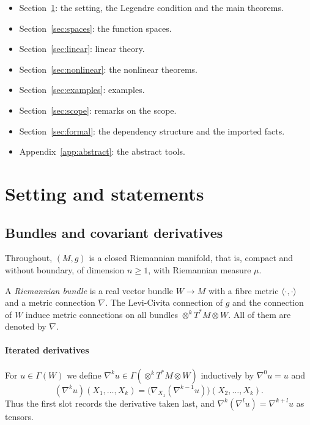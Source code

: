 \documentclass[11pt,reqno]{amsart}
\theoremstyle{definition}
\theoremstyle{remark}
\newcommand{\ip}[2]{\langle #1,#2\rangle}
\numberwithin{equation}{section}
\begin{document}
\begin{itemize}[nosep]
\item Section~\ref{sec:setting}: the setting, the Legendre condition and the main theorems.
\item Section~\ref{sec:spaces}: the function spaces.
\item Section~\ref{sec:linear}: linear theory.
\item Section~\ref{sec:nonlinear}: the nonlinear theorems.
\item Section~\ref{sec:examples}: examples.
\item Section~\ref{sec:scope}: remarks on the scope.
\item Section~\ref{sec:formal}: the dependency structure and the imported facts.
\item Appendix~\ref{app:abstract}: the abstract tools.
\end{itemize}

\section{Setting and statements}\label{sec:setting}

\subsection{Bundles and covariant derivatives}

Throughout, $(M,g)$ is a closed Riemannian manifold, that is, compact and without boundary, of
dimension $n\ge 1$, with Riemannian measure $\mu$.

A \emph{Riemannian bundle} is a real vector bundle $W\to M$ with a fibre metric $\ip{\cdot}{\cdot}$ and
a metric connection $\nabla$. The Levi-Civita connection of $g$ and the connection of $W$ induce metric
connections on all bundles $\otimes^k T^*M\otimes W$. All of them are denoted by $\nabla$.

\paragraph{Iterated derivatives} For $u\in\Gamma(W)$ we define
$\nabla^k u\in\Gamma(\otimes^kT^*M\otimes W)$ inductively by $\nabla^0u=u$ and
\[
  (\nabla^k u)(X_1,\dots,X_k)=\bigl(\nabla_{X_1}(\nabla^{k-1}u)\bigr)(X_2,\dots,X_k).
\]
Thus the first slot records the derivative taken last, and $\nabla^k(\nabla^l u)=\nabla^{k+l}u$ as
tensors.
\end{document}
